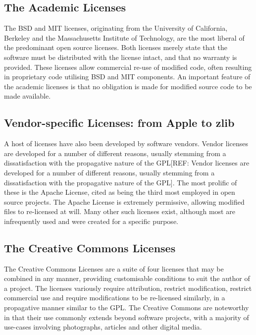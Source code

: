 \documentclass[a4paper]{article}
\begin{document}
\subsection{The Academic Licenses}

The BSD\cite{bsd} and MIT\cite{mit} licenses, originating from the University of California, Berkeley and the Massachusetts Institute of Technology, are the most liberal of the predominant open source licenses. Both licenses merely state that the software must be distributed with the license intact, and that no warranty is provided. These licenses allow commercial re-use of modified code, often resulting in proprietary code utilising BSD and MIT components. An important feature of the academic licenses is that no obligation is made for modified source code to be made available.

\subsection{Vendor-specific Licenses: from Apple to zlib}

A host of licenses have also been developed by software vendors. Vendor licenses are developed for a number of different reasons, usually stemming from a dissatisfaction with the propagative nature of the GPL[REF: Vendor licenses are developed for a number of different reasons, usually stemming from a dissatisfaction with the propagative nature of the GPL]. The most prolific of these is the Apache License\cite{apache}, cited as being the third most employed in open source projects\cite{oslicenseusage}. The Apache License is extremely permissive, allowing modified files to re-licensed at will. Many other such licenses exist, although most are infrequently used and were created for a specific purpose.

\subsection{The Creative Commons Licenses}

The Creative Commons Licenses\cite{cc} are a suite of four licenses that may be combined in any manner, providing customisable conditions to suit the author of a project. The licenses variously require attribution, restrict modification, restrict commercial use and require modifications to be re-licensed similarly, in a propagative manner similar to the GPL. The Creative Commons are noteworthy in that their use commonly extends beyond software projects, with a majority of use-cases involving photographs, articles and other digital media\cite{ccdir}.
\end{document}
